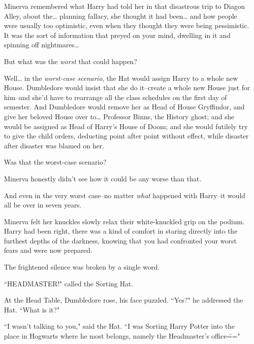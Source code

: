Minerva remembered what Harry had told her in that disastrous trip to Diagon Alley, about the{\ldots} planning fallacy, she thought it had been{\ldots} and how people were usually too optimistic, even when they thought they were being pessimistic. It was the sort of information that preyed on your mind, dwelling in it and spinning off nightmares{\ldots}

But what was the \emph{worst} that could happen?

Well{\ldots} in the \emph{worst-case scenario}, the Hat would assign Harry to a whole new House. Dumbledore would insist that she do it\---create a whole new House just for him\---and she'd have to rearrange all the class schedules on the first day of semester. And Dumbledore would remove her as Head of House Gryffindor, and give her beloved House over to{\ldots} Professor Binns, the History ghost; and she would be assigned as Head of Harry's House of Doom; and she would futilely try to give the child orders, deducting point after point without effect, while disaster after disaster was blamed on her.

Was that the worst-case scenario?

Minerva honestly didn't see how it could be any worse than that.

And even in the very worst case\---no matter \emph{what} happened with Harry\---it would all be over in seven years.

Minerva felt her knuckles slowly relax their white-knuckled grip on the podium. Harry had been right, there was a kind of comfort in staring directly into the furthest depths of the darkness, knowing that you had confronted your worst fears and were now prepared.

The frightened silence was broken by a single word.

``HEADMASTER!" called the Sorting Hat.

At the Head Table, Dumbledore rose, his face puzzled. ``Yes?" he addressed the Hat. ``What is it?"

``I wasn't talking to you," said the Hat. ``I was Sorting Harry Potter into the place in Hogwarts where he most belongs, namely the Headmaster's office\==="

